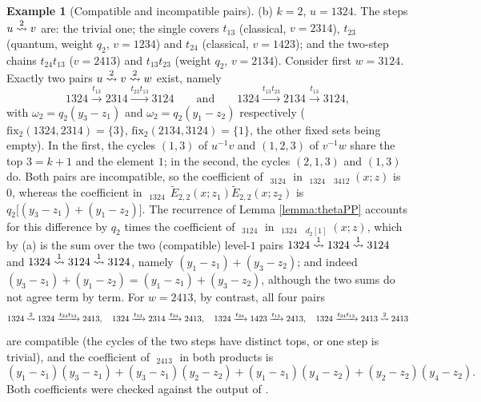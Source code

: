 \documentclass{amsart}
\theoremstyle{definition}
\newtheorem{example}[lemma]{Example}
\theoremstyle{remark}
\numberwithin{equation}{section}
\DeclareMathOperator{\qsch}{\widetilde{\mathfrak{S}}}
\newcommand{\xrightsquigarrow}[2][]{%
	\mathrel{\mathop{\rightsquigarrow}\limits^{\scriptstyle #2}%
	\ifx\hfuzz#1\hfuzz\else_{\scriptstyle #1}\fi}%
}
\newcommand{\tom}[1]{\ensuremath{\xrightsquigarrow{#1}}}
\newcommand{\fx}{\mathrm{fix}}
\newcommand{\qelem}{\widetilde{E}}
\begin{document}
\begin{example}[Compatible and incompatible pairs]
(b) $k=2$, $u=1324$. The steps $u\tom2v$ are: the trivial one; the single covers $t_{13}$ (classical, $v=2314$), $t_{23}$ (quantum, weight $q_2$, $v=1234$) and $t_{24}$ (classical, $v=1423$); and the two-step chains $t_{24}t_{13}$ ($v=2413$) and $t_{13}t_{23}$ (weight $q_2$, $v=2134$). Consider first $w=3124$. Exactly two pairs $u\tom2v\tom2w$ exist, namely
$$1324\xrightarrow{t_{13}}2314\xrightarrow{t_{23}t_{13}}3124\qquad\text{and}\qquad1324\xrightarrow{t_{13}t_{23}}2134\xrightarrow{t_{13}}3124,$$
with $\omega_2=q_2(y_3-z_1)$ and $\omega_2=q_2(y_1-z_2)$ respectively ($\fx_2(1324,2314)=\{3\}$, $\fx_2(2134,3124)=\{1\}$, the other fixed sets being empty). In the first, the cycles $(1,3)$ of $u^{-1}v$ and $(1,2,3)$ of $v^{-1}w$ share the top $3=k+1$ and the element $1$; in the second, the cycles $(2,1,3)$ and $(1,3)$ do. Both pairs are incompatible, so the coefficient of $\qsch_{3124}$ in $\qsch_{1324}\,\qsch_{3412}(x;z)$ is $0$, whereas the coefficient in $\qsch_{1324}\,\qelem_{2,2}(x;z_1)\qelem_{2,2}(x;z_2)$ is $q_2\big[(y_3-z_1)+(y_1-z_2)\big]$. The recurrence of Lemma \ref{lemma:thetaPP} accounts for this difference by $q_2$ times the coefficient of $\qsch_{3124}$ in $\qsch_{1324}\,\qsch_{d_2[1]}(x;z)$, which by (a) is the sum over the two (compatible) level-$1$ pairs $1324\tom11324\tom13124$ and $1324\tom13124\tom13124$, namely $(y_1-z_1)+(y_3-z_2)$; and indeed $(y_3-z_1)+(y_1-z_2)=(y_1-z_1)+(y_3-z_2)$, although the two sums do not agree term by term. For $w=2413$, by contrast, all four pairs
$$1324\tom21324\xrightarrow{t_{24}t_{13}}2413,\quad 1324\xrightarrow{t_{13}}2314\xrightarrow{t_{24}}2413,\quad 1324\xrightarrow{t_{24}}1423\xrightarrow{t_{13}}2413,\quad 1324\xrightarrow{t_{24}t_{13}}2413\tom22413$$
are compatible (the cycles of the two steps have distinct tops, or one step is trivial), and the coefficient of $\qsch_{2413}$ in both products is
$$(y_1-z_1)(y_3-z_1)+(y_3-z_1)(y_2-z_2)+(y_1-z_1)(y_4-z_2)+(y_2-z_2)(y_4-z_2).$$
Both coefficients were checked against the output of \cite{schubmult}.
\end{example}
\end{document}
